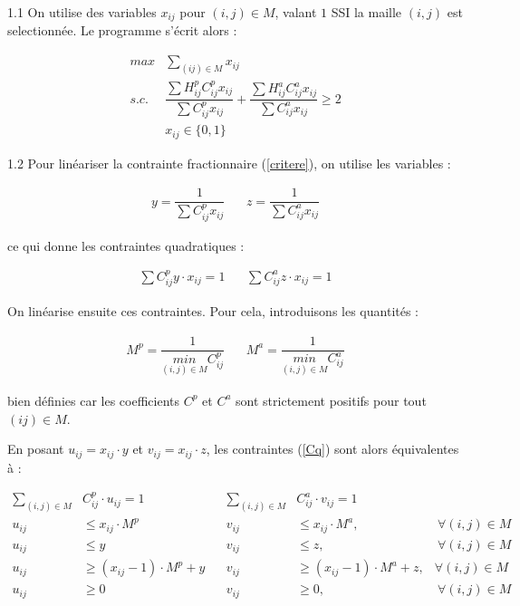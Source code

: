 \documentclass[12pt,a4paper]{article}
\begin{document}
1.1 On utilise des variables $x_{ij}$ pour $(i,j) \in M $, valant $1$ SSI la maille $(i,j)$ est selectionnée. Le programme s'écrit alors :

\begin{align}
\label{obj} max & \sum_{(ij)\in M} x_{ij} \\
s.c. \label{critere} \ & \dfrac{\sum H_{ij}^pC_{ij}^p x_{ij}}{\sum C_{ij}^p x_{ij}}+ \dfrac{\sum H_{ij}^a C_{ij}^a x_{ij}}{\sum C_{ij}^a x_{ij}}\geq 2 \\
& x_{ij}\in \{0,1\}
\end{align}

\vspace{0.5cm}

1.2 Pour linéariser la contrainte fractionnaire (\ref{critere}), on utilise les variables :

\begin{align*}
y=\dfrac{1}{\sum C_{ij}^p x_{ij}} \ \ & \ \  z =\dfrac{1}{\sum C_{ij}^a x_{ij}}
\end{align*}

ce qui donne les contraintes quadratiques :

\begin{align} \label{Cq}
 \sum C_{ij}^p y \cdot x_{ij} = 1 \ \ & \ \   \sum C_{ij}^a z \cdot x_{ij} = 1
\end{align}

On linéarise ensuite ces contraintes. Pour cela, introduisons les quantités :

\begin{align*}
M^{p} = \dfrac{1}{\underset{(i,j) \in M }{min} C_{ij}^p} \ \ & \ \ M^{a} = \dfrac{1}{\underset{(i,j) \in M }{min} C_{ij}^a} 
\end{align*}

bien définies car les coefficients $C^p $ et $C^a$ sont strictement positifs pour tout $(ij) \in M$.

En posant $u_{ij} = x_{ij} \cdot y$ et $v_{ij} = x_{ij} \cdot z$, les contraintes (\ref{Cq}) sont alors équivalentes à :

\begin{align} \label{Clin1}
\sum_{(i,j) \in M} & C^p_{ij}\cdot u_{ij} =1 \ \ & \ \ \sum_{(i,j) \in M} & C^a_{ij}\cdot v_{ij} =1 \  & \\
\label{Clin2} u_{ij} & \leq x_{ij} \cdot M^p \ \ & \ \  v_{ij} &\leq x_{ij} \cdot M^a, &\ \forall (i,j) \in M  \\
\label{Clin3} u_{ij} & \leq y  \ \ & \ \  v_{ij} & \leq z, &\ \forall (i,j) \in M  \\
\label{Clin4} u_{ij} & \geq (x_{ij}-1) \cdot M^p +y\ \ & \ \ v_{ij} & \geq (x_{ij}-1) \cdot M^a +z, & \forall (i,j) \in M \\
\label{Clin5} u_{ij} & \geq 0 \ \ & \ \  v_{ij} & \geq 0, &\ \forall (i,j) \in M  
\end{align}
\end{document}
